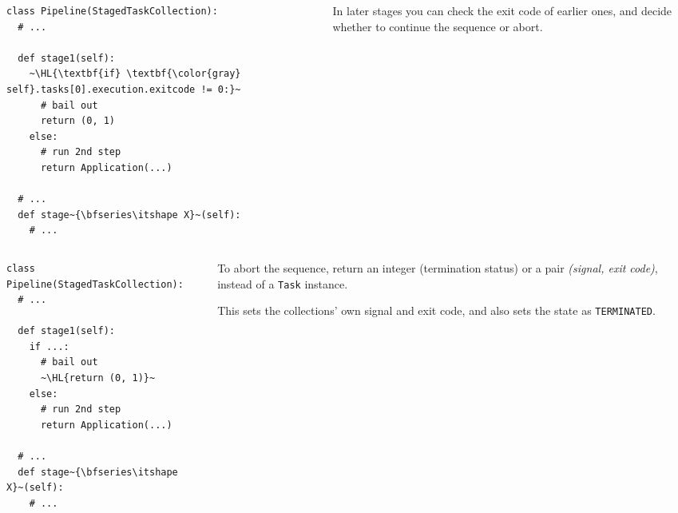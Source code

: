 \documentclass[english,serif,mathserif,xcolor=pdftex,dvipsnames,table]{beamer}
\begin{document}
\begin{frame}[fragile]
  \begin{columns}[c]
    \begin{column}{0.6\textwidth}
      \begin{lstlisting}[basicstyle=\footnotesize\ttfamily]
class Pipeline(StagedTaskCollection):
  # ...

  def stage1(self):
    ~\HL{\textbf{if} \textbf{\color{gray} self}.tasks[0].execution.exitcode != 0:}~
      # bail out
      return (0, 1)
    else:
      # run 2nd step
      return Application(...)

  # ...
  def stage~{\bfseries\itshape X}~(self):
    # ...
      \end{lstlisting}
    \end{column}
    \begin{column}{0.4\textwidth}
      \raggedleft

      \+\+\+\+\+
      In later stages you can check the exit code of
      earlier ones, and decide whether to continue the sequence or
      abort.
    \end{column}
  \end{columns}
\end{frame}


\begin{frame}[fragile]
  \begin{columns}[c]
    \begin{column}{0.6\textwidth}
      \begin{lstlisting}[basicstyle=\footnotesize\ttfamily]
class Pipeline(StagedTaskCollection):
  # ...

  def stage1(self):
    if ...:
      # bail out
      ~\HL{return (0, 1)}~
    else:
      # run 2nd step
      return Application(...)

  # ...
  def stage~{\bfseries\itshape X}~(self):
    # ...
      \end{lstlisting}
    \end{column}
    \begin{column}{0.4\textwidth}
      \raggedleft

      \+\+\+\+\+ 
      To abort the sequence, return an integer (termination
      status) or a pair \emph{(signal, exit code)}, instead of a
      \texttt{Task} instance.

      \+
      This sets the collections' own signal and exit code, and also sets the
      state as \texttt{TERMINATED}.
    \end{column}
  \end{columns}
\end{frame}
\end{document}
